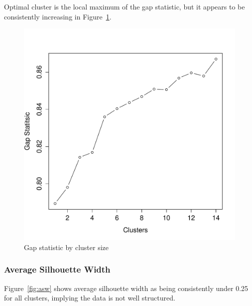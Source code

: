 \documentclass[letterpaper,12pt]{article}
\begin{document}
Optimal cluster is the local maximum of the gap statistic, but it appears to be
consistently increasing in Figure~\ref{fig:gap-statistic}.

\begin{figure}[h]
  \centering
  \includegraphics[width=\linewidth]{gap-statistic.pdf}
  \caption{Gap statistic by cluster size}
  \label{fig:gap-statistic}
\end{figure}

\subsubsection{Average Silhouette Width}

Figure~\ref{fig:asw} shows average silhouette width as being consistently under
0.25 for all clusters, implying the data is not well structured.
\end{document}

